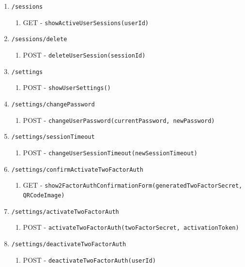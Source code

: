\documentclass[12pt,DIV14,BCOR10mm,a4paper,parskip=half-,headsepline,headinclude,english,ngerman,bibliography=totocnumbered]{scrreprt}
\begin{document}
\begin{enumerate}
\begin{enumerate}
\begin{enumerate}
      \item \texttt{/sessions}
      \begin{enumerate}
        \item GET - \texttt{showActiveUserSessions(userId)}
      \end{enumerate}
      \item \texttt{/sessions/delete}
      \begin{enumerate}
        \item POST - \texttt{deleteUserSession(sessionId)}
      \end{enumerate}
      \item \texttt{/settings}
      \begin{enumerate}
        \item POST - \texttt{showUserSettings()}
      \end{enumerate}
      \item \texttt{/settings/changePassword}
      \begin{enumerate}
        \item POST - \texttt{changeUserPassword(currentPassword, newPassword)}
      \end{enumerate}
      \item \texttt{/settings/sessionTimeout}
      \begin{enumerate}
        \item POST - \texttt{changeUserSessionTimeout(newSessionTimeout)}
      \end{enumerate}

      \item \texttt{/settings/confirmActivateTwoFactorAuth}
      \begin{enumerate}
        \item GET - \texttt{show2FactorAuthConfirmationForm(generatedTwoFactorSecret, QRCodeImage)}
      \end{enumerate}
      \item \texttt{/settings/activateTwoFactorAuth}
      \begin{enumerate}
        \item POST - \texttt{activateTwoFactorAuth(twoFactorSecret, activationToken)}
      \end{enumerate}
      \item \texttt{/settings/deactivateTwoFactorAuth}
      \begin{enumerate}
        \item POST - \texttt{deactivateTwoFactorAuth(userId)}
      \end{enumerate}
    \end{enumerate}


\end{enumerate}
\end{enumerate}
\end{document}
